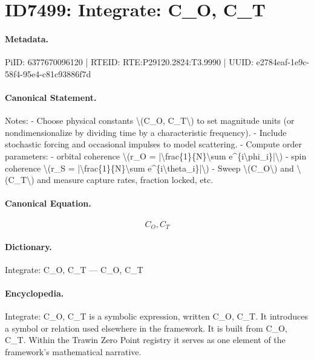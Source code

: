 \section*{ID7499: Integrate: C\_O, C\_T}
\paragraph{Metadata.}
PiID: 6377670096120 | RTEID: RTE:P29120.2824:T3.9990 | UUID: e2784eaf-1e9c-58f4-95e4-c81c93886f7d

\paragraph{Canonical Statement.}
Notes: - Choose physical constants \textbackslash{}(C\_O, C\_T\textbackslash{}) to set magnitude units (or nondimensionalize by dividing time by a characteristic frequency). - Include stochastic forcing and occasional impulses to model scattering. - Compute order parameters: - orbital coherence \textbackslash{}(r\_O = |\textbackslash{}frac\{1\}\{N\}\textbackslash{}sum e\textasciicircum{}\{i\textbackslash{}phi\_i\}|\textbackslash{}) - spin coherence \textbackslash{}(r\_S = |\textbackslash{}frac\{1\}\{N\}\textbackslash{}sum e\textasciicircum{}\{i\textbackslash{}theta\_i\}|\textbackslash{}) - Sweep \textbackslash{}(C\_O\textbackslash{}) and \textbackslash{}(C\_T\textbackslash{}) and measure capture rates, fraction locked, etc.

\paragraph{Canonical Equation.}
\[
C_O, C_T
\]

\paragraph{Dictionary.}
Integrate: C\_O, C\_T — C\_O, C\_T

\paragraph{Encyclopedia.}
Integrate: C\_O, C\_T is a symbolic expression, written C\_O, C\_T. It introduces a symbol or relation used elsewhere in the framework. It is built from C\_O, C\_T. Within the Trawin Zero Point registry it serves as one element of the framework's mathematical narrative.

